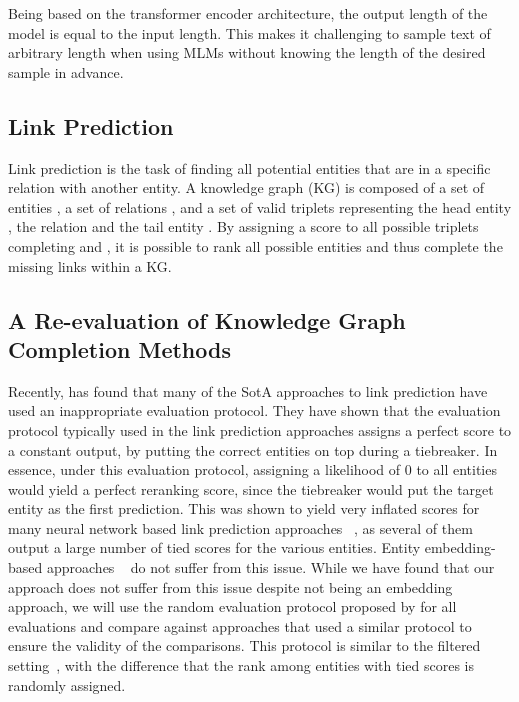 \documentclass[11pt,a4paper]{article}
\newcommand{\CiteT}[1]{\citet{#1}} \newcommand{\CiteP}[1]{~\citep{#1}} \newcommand{\CodeT}[1]{\texttt{#1}}
\begin{document}
Being based on the transformer encoder architecture, the output length of the model is equal to the input length.
This makes it challenging to sample text of arbitrary length when using MLMs without knowing the length of the desired sample in advance.

\subsection{Link Prediction}


Link prediction is the task of finding all potential entities that are in a specific relation with another entity.
A knowledge graph (KG) is composed of a set of entities , a set of relations , and a set of valid triplets  representing the head entity , the relation  and the tail entity .
By assigning a score to all possible triplets completing  and , it is possible to rank all possible entities and thus complete the missing links within a KG.


\subsection{A Re-evaluation of Knowledge Graph Completion Methods}


Recently, \CiteT{ReevaluationKB} has found that many of the SotA approaches to link prediction have used an inappropriate evaluation protocol.
They have shown that the evaluation protocol typically used in the link prediction approaches assigns a perfect score to a constant output, by putting the correct entities on top during a tiebreaker.
In essence, under this evaluation protocol, assigning a likelihood of 0 to all entities would yield a perfect reranking score, since the tiebreaker would put the target entity as the first prediction.
This was shown to yield very inflated scores for many neural network based link prediction approaches \CiteP{NN1, NN2, NN3}, as several of them output a large number of tied scores for the various entities.
Entity embedding-based approaches \CiteP{EMB1, EMB2, EMB3} do not suffer from this issue.
While we have found that our approach does not suffer from this issue despite not being an embedding approach, we will use the random evaluation protocol proposed by \CiteT{ReevaluationKB} for all evaluations and compare against approaches that used a similar protocol to ensure the validity of the comparisons.
This protocol is similar to the filtered setting\CiteP{FB15k}, with the difference that the rank among entities with tied scores is randomly assigned.
\end{document}
